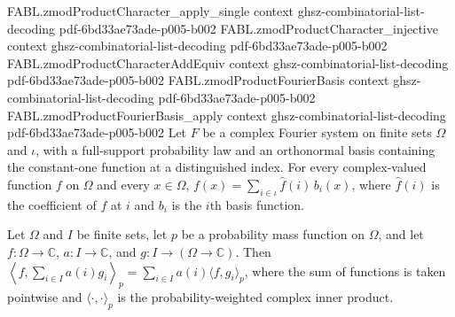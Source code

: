 \begin{theorem}
\proofstep
  {FABL.zmodProductCharacter_apply_single}
  {context}
  {ghsz-combinatorial-list-decoding}
  {pdf-6bd33ae73ade-p005-b002}
\proofstep
  {FABL.zmodProductCharacter_injective}
  {context}
  {ghsz-combinatorial-list-decoding}
  {pdf-6bd33ae73ade-p005-b002}
\proofstep
  {FABL.zmodProductCharacterAddEquiv}
  {context}
  {ghsz-combinatorial-list-decoding}
  {pdf-6bd33ae73ade-p005-b002}
\proofstep
  {FABL.zmodProductFourierBasis}
  {context}
  {ghsz-combinatorial-list-decoding}
  {pdf-6bd33ae73ade-p005-b002}
\proofstep
  {FABL.zmodProductFourierBasis_apply}
  {context}
  {ghsz-combinatorial-list-decoding}
  {pdf-6bd33ae73ade-p005-b002}
Let $F$ be a complex Fourier system on finite sets $Ω$ and $ι$, with a full-support
probability law and an orthonormal basis containing the constant-one function at a
distinguished index. For every complex-valued function $f$ on $Ω$ and every $x\in Ω$,
$f(x)=\sum_{i\in ι}\widehat f(i)\,b_i(x)$, where $\widehat f(i)$ is the coefficient of
$f$ at $i$ and $b_i$ is the $i$th basis function.
\end{theorem}

\begin{theorem}
\label{FABL.ComplexFourierSystem.pmfComplexInner_sum_right}
\leanok
{}
Let $\Omega$ and $I$ be finite sets, let $p$ be a probability mass function on $\Omega$,
and let $f:\Omega\to\mathbb C$, $a:I\to\mathbb C$, and $g:I\to(\Omega\to\mathbb C)$.
Then $\left\langle f,\sum_{i\in I}a(i)g_i\right\rangle_p=\sum_{i\in I}a(i)\langle
f,g_i\rangle_p$, where the sum of functions is taken pointwise and
$\langle\cdot,\cdot\rangle_p$ is the probability-weighted complex inner product.
\end{theorem}

